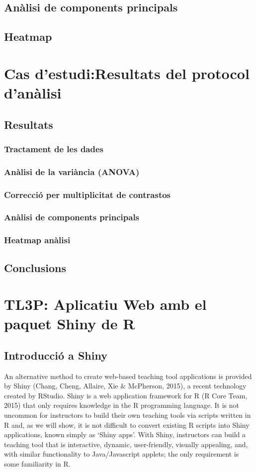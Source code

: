 \documentclass[english]{article}
\begin{document}
\subsection{Anàlisi de components principals}
\subsection{Heatmap}
\section{Cas d'estudi:Resultats del protocol d'anàlisi}
\subsection{Resultats}
\subsubsection{Tractament de les dades}
\subsubsection{Anàlisi de la variància (ANOVA)}
\subsubsection{Correcció per multiplicitat de contrastos}
\subsubsection{Anàlisi de components principals}
\subsubsection{Heatmap anàlisi}
\subsection{Conclusions}
\section{TL3P: Aplicatiu Web amb el paquet Shiny de R}
\subsection{Introducció a Shiny}
An alternative method to create web-based teaching tool applications is provided by Shiny
(Chang, Cheng, Allaire, Xie $\&$ McPherson, 2015), a recent technology created by RStudio.
Shiny is a web application framework for R (R Core Team, 2015) that only requires knowledge
in the R programming language. It is not uncommon for instructors to build their
own teaching tools via scripts written in R and, as we will show, it is not difficult to convert
existing R scripts into Shiny applications, known simply as ‘Shiny apps’. With Shiny,
instructors can build a teaching tool that is interactive, dynamic, user-friendly, visually
appealing, and, with similar functionality to Java/Javascript applets; the only requirement
is some familiarity in R.
\end{document}
